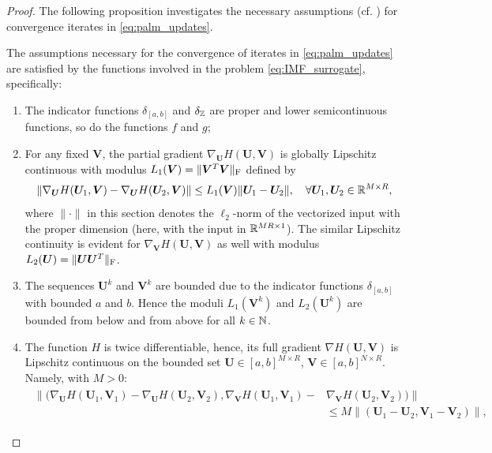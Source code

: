 \begin{proof}
    The following proposition investigates the necessary assumptions (cf. \cite[Asm. 1 and Asm. 2]{bolte2014proximal}) for convergence iterates in \eqref{eq:palm_updates}.
    \begin{prop}\label{prop:assumptions}
        The assumptions necessary for the convergence of iterates in \eqref{eq:palm_updates} are satisfied by the functions involved in the problem \eqref{eq:IMF_surrogate}, specifically:
        \begin{enumerate}
            \item The indicator functions $\delta_{[a,b]}$ and $\delta_\mathbb Z$ are proper and lower semicontinuous functions, so do the functions $f$ and $g$;
            \item For any fixed $\bm V$, the partial gradient $\nabla_{\bm U} H(\bm U, \bm V)$ is globally Lipschitz continuous with modulus $L_1(\bm V) = \|\bm V^T \bm V\|_{\rm F}$ defined by
            \begin{equation*}
                \|\nabla_{\bm U} H(\bm U_1, \bm V) - \nabla_{\bm U} H(\bm U_2, \bm V)\| \leq L_1(\bm V) \|\bm U_1 - \bm U_2\|, \quad \forall \bm U_1,\bm U_2 \in \mathbb{R}^{M\times R},
            \end{equation*}
            where $\|\cdot\|$ in this section denotes the $\ell_2$-norm of the vectorized input with the proper dimension (here, with the input in $\mathbb{R}^{MR\times 1}$).
            The similar Lipschitz continuity is evident for $\nabla_{\bm V} H(\bm U, \bm V)$ as well with modulus $L_2(\bm U) = \|\bm U \bm U^T\|_{\rm F}$.
            \item The sequences $\bm U^k$ and $\bm V^k$ are bounded due to the indicator functions $\delta_{[a,b]}$ with bounded $a$ and $b$. Hence the moduli $L_1(\bm V^k)$ and $L_2(\bm U^k)$ are bounded from below and from above for all $k\in\mathbb N$.
            \item The function $H$ is twice differentiable, hence, its full gradient $\nabla H(\bm U,\bm V)$ is Lipschitz continuous on the bounded set $\bm U \in [a,b]^{M\times R}$, $\bm V \in [a,b]^{N\times R}$. Namely, with $M > 0$:
            \begin{align}
                \begin{split}
                    \|(\nabla_{\bm U} H(\bm U_1, \bm V_1) - \nabla_{\bm U} H(\bm U_2, \bm V_2), \nabla_{\bm V} H(\bm U_1, \bm V_1) - &\nabla_{\bm V} H(\bm U_2, \bm V_2))\| \\
                    &\leq M \|(\bm U_1 - \bm U_2, \bm V_1 - \bm V_2)\|,
                \end{split}

\end{align}
\end{enumerate}
\end{prop}
\end{proof}
